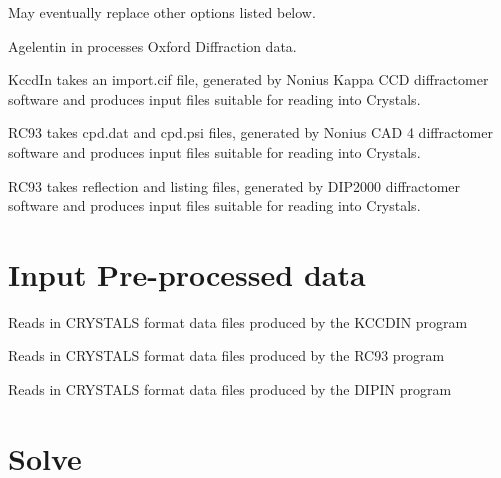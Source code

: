 \documentclass[10pt,a4paper]{report}
\begin{document}
 


May eventually replace other options listed below.




\bigskip{}




Agelentin in processes Oxford Diffraction data.




\bigskip{}




KccdIn takes an import.cif file, generated by Nonius Kappa CCD
diffractomer software and produces input files suitable for reading
into Crystals.


\bigskip{}




RC93 takes cpd.dat and cpd.psi files, generated by Nonius CAD 4
diffractomer software and produces input files suitable for reading
into Crystals.


\bigskip{}




RC93 takes reflection and listing files, generated by DIP2000
diffractomer software and produces input files suitable for reading
into Crystals.

\section{Input Pre-processed data}
\label{Use} 



\bigskip{}




Reads in CRYSTALS format data files produced by the KCCDIN program




\bigskip{}




Reads in CRYSTALS format data files produced by the RC93 program




\bigskip{}




Reads in CRYSTALS format data files produced by the DIPIN program






\section{Solve}
\end{document}
